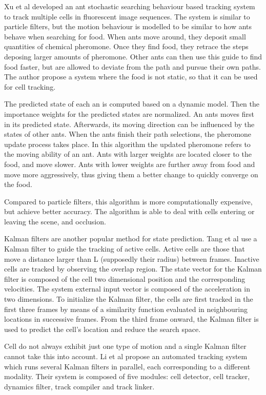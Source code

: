 Xu et al \cite{xu12} developed an ant stochastic searching behaviour based tracking system to track multiple cells in fluorescent image sequences. The system is similar to particle filters, but the motion behaviour is modelled to be similar to how ants behave when searching for food. When ants move around, they deposit small quantities of chemical pheromone. Once they find food, they retrace the steps deposing larger amounts of pheromone. Other ants can then use this guide to find food faster, but are allowed to deviate from the path and pursue their own paths. The author propose a system where the food is not static, so that it can be used for cell tracking.

The predicted state of each an is computed based on a dynamic model. Then the importance weights for the predicted states are normalized. An ants moves first in its predicted state. Afterwards, its moving direction can be influenced by the states of other ants. When the ants finish their path selections, the pheromone update process takes place. In this algorithm the updated pheromone refers to the moving ability of an ant. Ants with larger weights are located closer to the food, and move slower. Ants with lower weights are further away from food and move more aggressively, thus giving them a better change to quickly converge on the food.

Compared to particle filters, this algorithm is more computationally expensive, but achieve better accuracy. The algorithm is able to deal with cells entering or leaving the scene, and occlusion.

Kalman filters are another popular method for state prediction. Tang et al \cite{tang} use a Kalman filter to guide the tracking of active cells. Active cells are those that move a distance larger than L (supposedly their radius) between frames. Inactive cells are tracked by observing the overlap region. The state vector for the Kalman filter is composed of the cell two dimensional position and the corresponding velocities. The system external input vector is composed of the acceleration in two dimensions. To initialize the Kalman filter, the cells are first tracked in the first three frames by means of a similarity function evaluated in neighbouring locations in successive frames. From the third frame onward, the Kalman filter is used to predict the cell's location and reduce the search space.

Cell do not always exhibit just one type of motion and a single Kalman filter cannot take this into account. Li et al \cite{li07} propose an automated tracking system which runs several Kalman filters in parallel, each corresponding to a different modality. Their system is composed of five modules: cell detector, cell tracker, dynamics filter, track compiler and track linker.

